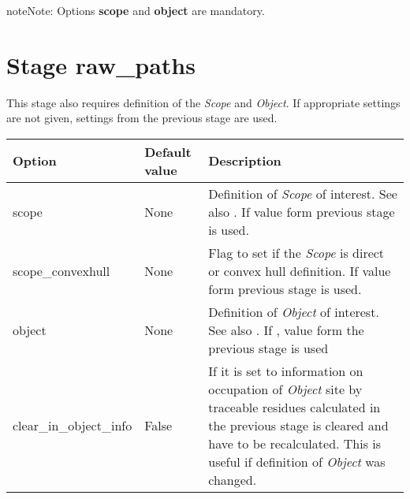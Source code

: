 \documentclass[a4paper,10pt,english]{sphinxmanual}
\begin{document}
\begin{notice}{note}{Note:}
Options \textbf{scope} and \textbf{object} are mandatory.
\end{notice}


\section{Stage \textbf{raw\_paths}}
\label{valve/valve_config:stage-raw-paths}
This stage also requires definition of the \emph{Scope} and \emph{Object}. If appropriate settings are not given, settings from the previous stage are used.

\begin{tabulary}{\linewidth}{|L|L|L|}
\hline
\textsf{\relax 
Option
} & \textsf{\relax 
Default value
} & \textsf{\relax 
Description
}\\
\hline
scope
 & 
None
 & 
Definition of \emph{Scope} of interest. See also
{\hyperref[valve/valve_manual:scope\string-definition]{}}. If  value form previous stage
is used.
\\
\hline
scope\_convexhull
 & 
None
 & 
Flag to set if the \emph{Scope} is direct or convex hull definition.
If  value form previous stage is used.
\\
\hline
object
 & 
None
 & 
Definition of \emph{Object} of interest. See also
{\hyperref[valve/valve_manual:object\string-definition]{}}. If , value form the previous
stage is used
\\
\hline
clear\_in\_object\_info
 & 
False
 & 
If it is set to  information on occupation of \emph{Object}
site by traceable residues calculated in the previous stage is
cleared and have to be recalculated. This is useful if
definition of \emph{Object} was changed.
\\
\hline\end{tabulary}
\end{document}
